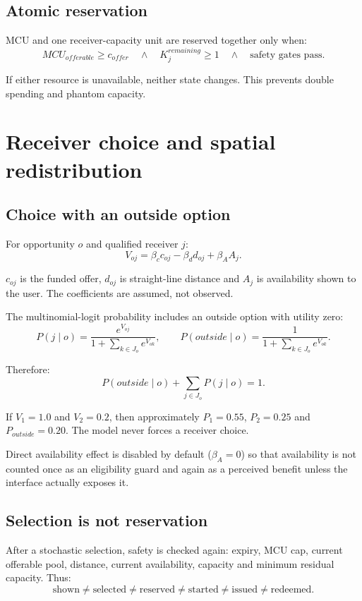 \documentclass[11pt,a4paper]{article}
\begin{document}
\subsection{Atomic reservation}

MCU and one receiver-capacity unit are reserved together only when:
\[
MCU_{offerable}\ge c_{offer}
\quad\land\quad
K_j^{remaining}\ge1
\quad\land\quad
\text{safety gates pass}.
\]

If either resource is unavailable, neither state changes. This prevents double spending and phantom capacity.

\section{Receiver choice and spatial redistribution}

\subsection{Choice with an outside option}

For opportunity $o$ and qualified receiver $j$:
\[
V_{oj}=\beta_c c_{oj}-\beta_d d_{oj}+\beta_A A_j.
\]

$c_{oj}$ is the funded offer, $d_{oj}$ is straight-line distance and $A_j$ is availability shown to the user. The coefficients are assumed, not observed.

The multinomial-logit probability includes an outside option with utility zero:
\[
P(j\mid o)=\frac{e^{V_{oj}}}{1+\sum_{k\in J_o}e^{V_{ok}}},
\qquad
P(outside\mid o)=\frac{1}{1+\sum_{k\in J_o}e^{V_{ok}}}.
\]

Therefore:
\[
P(outside\mid o)+\sum_{j\in J_o}P(j\mid o)=1.
\]

If $V_1=1.0$ and $V_2=0.2$, then approximately $P_1=0.55$, $P_2=0.25$ and $P_{outside}=0.20$. The model never forces a receiver choice.

Direct availability effect is disabled by default ($\beta_A=0$) so that availability is not counted once as an eligibility guard and again as a perceived benefit unless the interface actually exposes it.

\subsection{Selection is not reservation}

After a stochastic selection, safety is checked again: expiry, MCU cap, current offerable pool, distance, current availability, capacity and minimum residual capacity. Thus:
\[
\text{shown}\ne\text{selected}\ne\text{reserved}
\ne\text{started}\ne\text{issued}\ne\text{redeemed}.
\]
\end{document}
